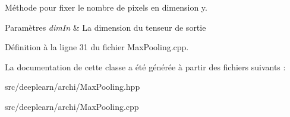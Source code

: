 Méthode pour fixer le nombre de pixels en dimension y. 


\begin{DoxyParams}{Paramètres}
{\em dim\+In} & La dimension du tenseur de sortie \\
\hline
\end{DoxyParams}


Définition à la ligne 31 du fichier Max\+Pooling.\+cpp.



La documentation de cette classe a été générée à partir des fichiers suivants \+:\begin{DoxyCompactItemize}
\item 
src/deeplearn/archi/Max\+Pooling.\+hpp\item 
src/deeplearn/archi/Max\+Pooling.\+cpp\end{DoxyCompactItemize}

